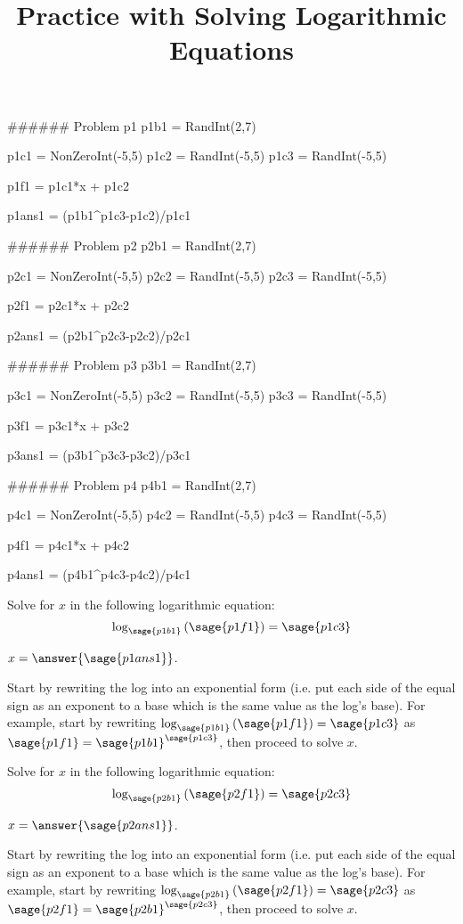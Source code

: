 \documentclass{ximera}
\title{Practice with Solving Logarithmic Equations}
\begin{document}


\begin{sagesilent}

###### Problem p1
p1b1 = RandInt(2,7)

p1c1 = NonZeroInt(-5,5)
p1c2 = RandInt(-5,5)
p1c3 = RandInt(-5,5)

p1f1 = p1c1*x + p1c2

p1ans1 = (p1b1^p1c3-p1c2)/p1c1


###### Problem p2
p2b1 = RandInt(2,7)

p2c1 = NonZeroInt(-5,5)
p2c2 = RandInt(-5,5)
p2c3 = RandInt(-5,5)

p2f1 = p2c1*x + p2c2

p2ans1 = (p2b1^p2c3-p2c2)/p2c1


###### Problem p3
p3b1 = RandInt(2,7)

p3c1 = NonZeroInt(-5,5)
p3c2 = RandInt(-5,5)
p3c3 = RandInt(-5,5)

p3f1 = p3c1*x + p3c2

p3ans1 = (p3b1^p3c3-p3c2)/p3c1


###### Problem p4
p4b1 = RandInt(2,7)

p4c1 = NonZeroInt(-5,5)
p4c2 = RandInt(-5,5)
p4c3 = RandInt(-5,5)

p4f1 = p4c1*x + p4c2

p4ans1 = (p4b1^p4c3-p4c2)/p4c1



\end{sagesilent}

\begin{problem}
    Solve for $x$ in the following logarithmic equation:
    \[
        \log_{\sage{p1b1}}\left(\sage{p1f1}\right) = \sage{p1c3}
    \]

    $x = \answer{\sage{p1ans1}}$.
    \begin{feedback}
        Start by rewriting the log into an exponential form (i.e. put each side of the equal sign as an exponent to a base which is the same value as the log's base). For example, start by rewriting $\log_{\sage{p1b1}}\left(\sage{p1f1}\right) = \sage{p1c3}$ as $\sage{p1f1} = \sage{p1b1}^{\sage{p1c3}}$, then proceed to solve $x$.
    \end{feedback}
\end{problem}


\begin{problem}
    Solve for $x$ in the following logarithmic equation:
    \[
        \log_{\sage{p2b1}}\left(\sage{p2f1}\right) = \sage{p2c3}
    \]

    $x = \answer{\sage{p2ans1}}$.
    \begin{feedback}
        Start by rewriting the log into an exponential form (i.e. put each side of the equal sign as an exponent to a base which is the same value as the log's base). For example, start by rewriting $\log_{\sage{p2b1}}\left(\sage{p2f1}\right) = \sage{p2c3}$ as $\sage{p2f1} = \sage{p2b1}^{\sage{p2c3}}$, then proceed to solve $x$.
    \end{feedback}
\end{problem}
\end{document}

